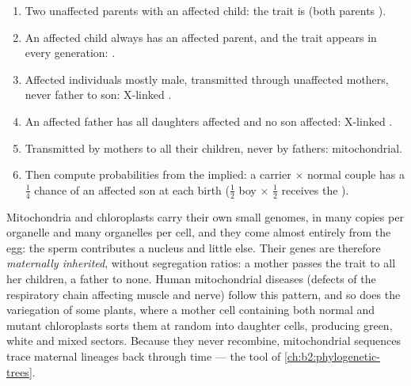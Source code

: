 \begin{method}\label{met:b2:meiosis-heredity:pedigree}
\begin{enumerate}
  \item Two unaffected parents with an affected child: the trait is
         (both parents ).
  \item An affected child always has an affected parent, and the
        trait appears in every generation: .
  \item Affected individuals mostly male, transmitted through
        unaffected mothers, never father to son: X-linked .
  \item An affected father has all daughters affected and no son
        affected: X-linked .
  \item Transmitted by mothers to all their children, never by
        fathers: mitochondrial.
  \item Then compute probabilities from the  implied:
        a carrier $\times$ normal couple has a $\tfrac14$ chance of an
        affected son at each birth ($\tfrac12$ boy $\times$ $\tfrac12$
        receives the ).
\end{enumerate}
\end{method}

\begin{definition}\label{def:b2:meiosis-heredity:extranuclear}
Mitochondria and chloroplasts carry their own small genomes, in
many copies per organelle and many organelles per cell, and they
come almost entirely from the egg: the sperm contributes a nucleus
and little else. Their genes are therefore \emph{maternally
inherited}, without segregation ratios: a mother passes the trait to
all her children, a father to none. Human mitochondrial diseases
(defects of the respiratory chain affecting muscle and nerve)
follow this pattern, and so does the variegation of some plants,
where a mother cell containing both normal and mutant chloroplasts
sorts them at random into daughter cells, producing green, white
and mixed sectors. Because they never recombine, mitochondrial
sequences trace maternal lineages back through time --- the tool of
\cref{ch:b2:phylogenetic-trees}.
\end{definition}

